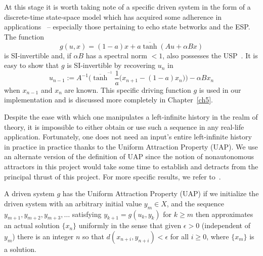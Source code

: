 
At this stage it is worth taking note of a specific driven system in the form of a discrete-time state-space model which has acquired some adherence in applications~\cite{Manju_IEEE} -- especially those pertaining to echo state betworks and the ESP. The function 
\begin{equation}  \label{eqn_driving}
  g(u,x) = (1-a)x + a\overline{\tanh}(Au + \alpha Bx)
\end{equation} 
is SI-invertible and, if $\alpha B$ has a spectral norm $<1$, also possesses the USP~\cite[Theorem.2]{manjunath2013echo }. 
It is easy to show that $g$ is SI-invertible by recovering $u_n$ in 
\begin{equation} \label{eqn_SI_RNN}
  u_{n-1} := A^{-1}\bigg(\overline{\tanh}^{^{-1}}\frac{1}{a}\Big(x_{n+1}-(1-a)x_n\Big) \bigg) - \alpha B x_n
  \end{equation}
  when $x_{n-1}$ and $x_n$ are known.
This specific driving function $g$ is used in our implementation and is discussed more completely in Chapter~\ref{ch5}.

Despite the ease with which one manipulates a left-infinite history in the realm of theory, it is impossible to either obtain or use such a sequence in any real-life application.
Fortunately, one does not need an input's entire left-infinite history in practice in practice thanks to the Uniform Attraction Property (UAP). 
We use an alternate version of the definition of UAP since the notion of nonautonomous attractors in this project would take some time to establish and detracts from the principal thrust of this project. 
For more specific results, we refer to~\cite{Manju_Nonlinearity}. 

\begin{Definition}
  \label{Dfn_UAP}\rm
  A driven system $g$ has the Uniform Attraction Property (UAP) if we initialize the driven system
with an arbitrary initial value $y_m \in X$, and the sequence $y_{m+1}, y_{m+2}, y_{m+3},\ldots$ satisfying $y_{k+1}= g(u_k,y_k)$ for $k \geq m$ then approximates an actual solution $\{x_n\}$ uniformly in the sense that given $\epsilon>0$ (independent of $y_m$) there is an integer $n$ so that $d(x_{n+i}, y_{n+i})<\epsilon$ for all $i\ge 0$, where $\{x_m\}$ is a solution.
\end{Definition}


